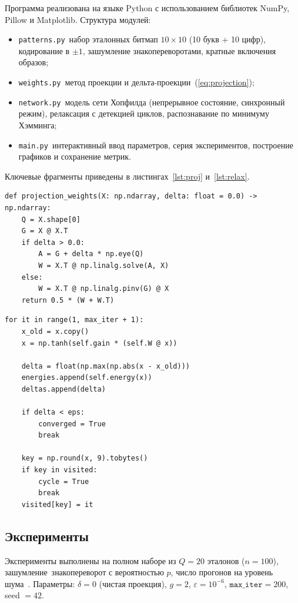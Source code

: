 Программа реализована на языке Python с использованием библиотек NumPy, Pillow и Matplotlib. Структура модулей:
\begin{itemize}
	\item \texttt{patterns.py}~\mdash  набор эталонных битмап $10 \times 10$ (10 букв + 10 цифр), кодирование в $\pm 1$, зашумление знакопереворотами, кратные включения образов;
	\item \texttt{weights.py}~\mdash  метод проекции и дельта-проекции~(\ref{eq:projection});
	\item \texttt{network.py}~\mdash  модель сети Хопфилда (непрерывное состояние, синхронный режим), релаксация с детекцией циклов, распознавание по минимуму Хэмминга;
	\item \texttt{main.py}~\mdash  интерактивный ввод параметров, серия экспериментов, построение графиков и сохранение метрик.
\end{itemize}

Ключевые фрагменты приведены в листингах~\ref{lst:proj} и~\ref{lst:relax}.

\begin{lstlisting}[caption={Метод проекции / дельта-проекции},label={lst:proj}]
def projection_weights(X: np.ndarray, delta: float = 0.0) -> np.ndarray:
    Q = X.shape[0]
    G = X @ X.T
    if delta > 0.0:
        A = G + delta * np.eye(Q)
        W = X.T @ np.linalg.solve(A, X)
    else:
        W = X.T @ np.linalg.pinv(G) @ X
    return 0.5 * (W + W.T)
\end{lstlisting}

\begin{lstlisting}[caption={Синхронная релаксация с проверкой остановки},label={lst:relax}]
for it in range(1, max_iter + 1):
    x_old = x.copy()
    x = np.tanh(self.gain * (self.W @ x))

    delta = float(np.max(np.abs(x - x_old)))
    energies.append(self.energy(x))
    deltas.append(delta)

    if delta < eps:
        converged = True
        break

    key = np.round(x, 9).tobytes()
    if key in visited:
        cycle = True
        break
    visited[key] = it
\end{lstlisting}

\subsection{Эксперименты}

Эксперименты выполнены на полном наборе из $Q = 20$ эталонов ($n = 100$), зашумление~\mdash  знакопереворот с вероятностью $p$, число прогонов на уровень шума~. Параметры: $\delta = 0$ (чистая проекция), $g = 2$, $\varepsilon = 10^{-6}$, $\texttt{max\_iter} = 200$, seed $= 42$.

